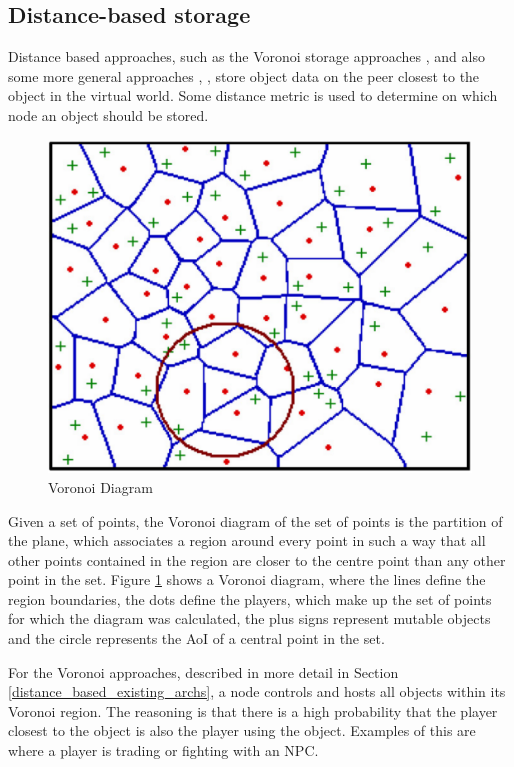 \documentclass[10pt,a4paper,journal,cspaper,compsoc]{IEEEtran}
\begin{document}
\subsection{Distance-based storage}
\label{distance_based_storage}

Distance based approaches, such as the Voronoi storage approaches \cite{Buyukkaya_voronoi_state_management}, \cite{Hu_voronoi_IM} and also some more
general approaches \cite{colyseus_distance_based}, \cite{solipsis}, store object data on the peer closest to the object in the virtual world. Some
distance metric is used to determine on which node an object should be stored.

\begin{figure}[htbp]
 \centering
 \includegraphics[width=\columnwidth]{voronoi_diagram}
 \caption{Voronoi Diagram \cite{Buyukkaya_voronoi_state_management}}
 \label{fig_voronoi_diagram}
\end{figure}
%
Given a set of points, the Voronoi diagram of the set of points is the partition of the plane, which associates a region around every point in such a
way that all other points contained in the region are closer to the centre point than any other point in the set. Figure \ref{fig_voronoi_diagram}
shows a Voronoi diagram, where the lines define the region boundaries, the dots define the players, which make up the set of points for which the
diagram was calculated, the plus signs represent mutable objects and the circle represents the \ac{AoI} of a central point in the set.

For the Voronoi approaches, described in more detail in Section \ref{distance_based_existing_archs}, a node controls and hosts all objects within its
Voronoi region. The reasoning is that there is a high probability that the player closest to the object is also the player using the object. Examples
of this are where a player is trading or fighting with an NPC.
\end{document}
